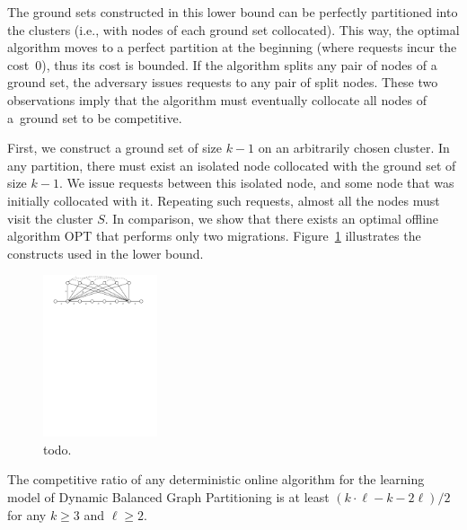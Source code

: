 \documentclass[a4paper,anonymous,USenglish]{lipics-v2019}
\newcommand{\OPT}{\textsc{OPT}\xspace}
\begin{document}
The ground sets constructed in this lower bound can be perfectly partitioned into the clusters (i.e., with nodes of each ground set collocated).
This way, the optimal algorithm moves to a perfect partition at the beginning (where requests incur the cost~$0$), thus its cost is bounded.
If the algorithm splits any pair of nodes of a ground set, the adversary issues requests to any pair of split nodes.
These two observations imply that the algorithm must eventually collocate all nodes of a~ground set to be competitive.

First, we construct a ground set of size $k-1$ on an arbitrarily chosen cluster.
In any partition, there must exist an isolated node collocated with the ground set of size $k-1$.
We issue requests between this isolated node, and some node that was initially collocated with it.
Repeating such requests, almost all the nodes must visit the cluster $S$.
In comparison, we show that there exists an optimal offline algorithm \OPT that performs only two migrations.
Figure~\ref{fig:lb} illustrates the constructs used in the lower bound.


\begin{figure}[H]
	\centering
	\includegraphics[width=0.3\textwidth]{figs/substitute}
	\caption{todo.}
	\label{fig:lb}
\end{figure}


\begin{theorem}
	\label{th:lowerbound}
	The competitive ratio of any deterministic online algorithm for the learning model of Dynamic Balanced Graph Partitioning is at least $(k\cdot \ell - k - 2\ell)/2$ for any $k\geq 3$ and $\ell \geq 2$.
\end{theorem}
\end{document}
